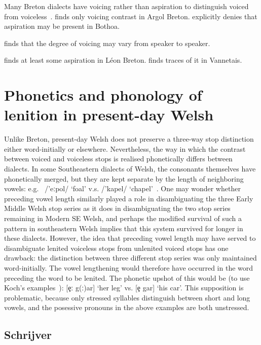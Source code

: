 Many Breton dialects have voicing rather than aspiration to distinguish voiced from voiceless~\autocite[221]{Ios_Representation13}. \Textcite[114]{Bot_Etude82} finds only voicing contrast in Argol Breton. \Textcite[177--178]{Hum_Phonologie95a} explicitly denies that aspiration may be present in Bothoa.

\Textcite[9]{carlyle_syllabic_1988} finds that the degree of voicing may vary from speaker to speaker.

\Textcite[157--167]{falchun_systeme_1951} finds at least some aspiration in  Léon Breton. \Textcite{Ter_Grammaire70} finds traces of it in Vannetais.


\section{Phonetics and phonology of lenition in present-day Welsh} 
Unlike Breton, present-day Welsh does not preserve a three-way stop distinction either word-initially or elsewhere. Nevertheless, the way in which the contrast between voiced and voiceless stops is realised phonetically differs between dialects. In some Southeastern dialects of Welsh, the consonants themselves have phonetically merged, but they are kept separate by the length of neighboring vowels: e.g.\  /'eːpol/ `foal' v.s.  /'kapel/ `chapel'~\autocite[85]{awbery_phonotactic_1984}. One may wonder whether preceding vowel length similarly played a role in disambiguating the three Early Middle Welsh stop series as it does in disambiguating the two stop series remaining in Modern SE Welsh, and perhaps the modified survival of such a pattern in southeastern Welsh implies that this system survived for longer in these dialects. However, the idea that preceding vowel length may have served to disambiguate lenited voiceless stops from unlenited voiced stops has one drawback: the distinction between three different stop series was only maintained word-initially. The vowel lengthening would therefore have occurred in the word preceding the word to be lenited. The phonetic upshot of this would be (to use Koch's examples~\autocite*[§~26]{koch_*cothairche_1990}): [\c{e}ː g(ː)ar] `her leg' vs. [\c{e} gar] `his car'. This supposition is problematic, because only stressed syllables distinguish between short and long vowels, and the posessive pronouns in the above examples are both unstressed. 

\subsection{Schrijver}
\label{sec:schrijver}

